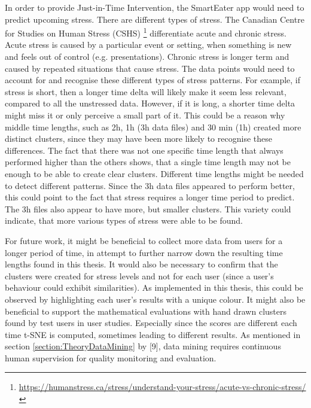 In order to provide Just-in-Time Intervention, the SmartEater app would need to predict upcoming stress. There are different types of stress. The Canadian Centre for Studies on Human Stress (CSHS) \footnote{\url{https://humanstress.ca/stress/understand-your-stress/acute-vs-chronic-stress/}} differentiate acute and chronic stress. Acute stress is caused by a particular event or setting, when something is new and feels out of control (e.g. presentations). Chronic stress is longer term and caused by repeated situations that cause stress. The data points would need to account for and recognise these different types of stress patterns. For example, if stress is short, then a longer time delta will likely make it seem less relevant, compared to all the unstressed data. However, if it is long, a shorter time delta might miss it or only perceive a small part of it. This could be a reason why middle time lengths, such as 2h, 1h (3h data files) and 30 min (1h) created more distinct clusters, since they may have been more likely to recognise these differences. The fact that there was not one specific time length that always performed higher than the others shows, that a single time length may not be enough to be able to create clear clusters. Different time lengths might be needed to detect different patterns. Since the 3h data files appeared to perform better, this could point to the fact that stress requires a longer time period to predict. The 3h files also appear to have more, but smaller clusters. This variety could indicate, that more various types of stress were able to be found.

For future work, it might be beneficial to collect more data from users for a longer period of time, in attempt to further narrow down the resulting time lengths found in this thesis. It would also be necessary to confirm that the clusters were created for stress levels and not for each user (since a user's behaviour could exhibit similarities). As implemented in this thesis, this could be observed by highlighting each user's results with a unique colour. It might also be beneficial to support the mathematical evaluations with hand drawn clusters found by test users in user studies. Especially since the scores are different each time t-SNE is computed, sometimes leading to different results. As mentioned in section \ref{section:TheoryDataMining} by \textcite{DataMiningAndPredictiveAnalytics}[9], data mining requires continuous human supervision for quality monitoring and evaluation.

